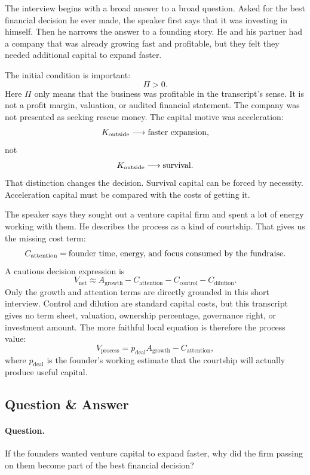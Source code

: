 \documentclass[11pt,oneside]{book}
\begin{document}
The interview begins with a broad answer to a broad question. Asked for the best financial decision he ever made, the speaker first says that it was investing in himself. Then he narrows the answer to a founding story. He and his partner had a company that was already growing fast and profitable, but they felt they needed additional capital to expand faster.

The initial condition is important:
\[
\Pi>0.
\]
Here \(\Pi\) only means that the business was profitable in the transcript's sense. It is not a profit margin, valuation, or audited financial statement. The company was not presented as seeking rescue money. The capital motive was acceleration:
\[
K_{\mathrm{outside}}\longrightarrow \hbox{faster expansion},
\]
not
\[
K_{\mathrm{outside}}\longrightarrow \hbox{survival}.
\]
That distinction changes the decision. Survival capital can be forced by necessity. Acceleration capital must be compared with the costs of getting it.

The speaker says they sought out a venture capital firm and spent a lot of energy working with them. He describes the process as a kind of courtship. That gives us the missing cost term:
\[
C_{\mathrm{attention}}
=
\hbox{founder time, energy, and focus consumed by the fundraise}.
\]
A cautious decision expression is
\[
V_{\mathrm{net}}
\approx
A_{\mathrm{growth}}
-
C_{\mathrm{attention}}
-
C_{\mathrm{control}}
-
C_{\mathrm{dilution}}.
\]
Only the growth and attention terms are directly grounded in this short interview. Control and dilution are standard capital costs, but this transcript gives no term sheet, valuation, ownership percentage, governance right, or investment amount. The more faithful local equation is therefore the process value:
\[
V_{\mathrm{process}}
=
p_{\mathrm{deal}}A_{\mathrm{growth}}
-
C_{\mathrm{attention}},
\]
where \(p_{\mathrm{deal}}\) is the founder's working estimate that the courtship will actually produce useful capital.

\subsection{Question \& Answer}

\paragraph{Question.}
If the founders wanted venture capital to expand faster, why did the firm passing on them become part of the best financial decision?
\end{document}
